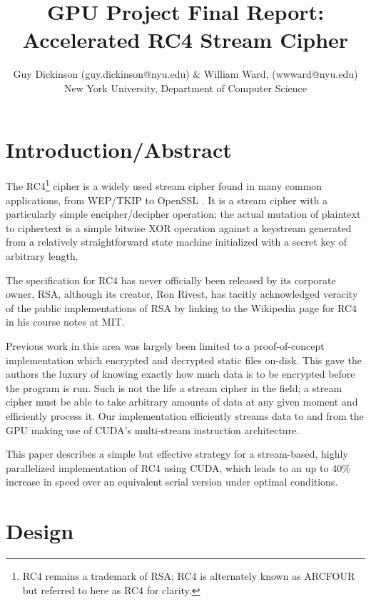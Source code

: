 \documentclass[twocolumn]{article}
\begin{document}
  
  \title{GPU Project Final Report: Accelerated RC4 Stream Cipher}
  \author{Guy Dickinson (guy.dickinson@nyu.edu) \& William Ward, (wwward@nyu.edu) \\ New York University, Department of Computer Science}
  \maketitle
  
  \section{Introduction/Abstract}
  The RC4\footnote{RC4 remains a trademark of RSA; RC4 is alternately known as ARCFOUR but referred to here as RC4 for clarity.} cipher is a widely used stream cipher found in many common applications, from WEP/TKIP \cite[p. 171]{cisco-netsec} to OpenSSL \cite{openssl}. It is a stream cipher with a particularly simple encipher/decipher operation; the actual mutation of plaintext to ciphertext is a simple bitwise XOR operation against a keystream generated from a relatively straightforward state machine initialized with a secret key of arbitrary length.
  
  The specification for RC4 has never officially been released by its corporate owner, RSA, although its creator, Ron Rivest, has tacitly acknowledged veracity of the public implementations of RSA by linking to the Wikipedia page for RC4 in his course notes at MIT.\cite{rivest-notes}
  
  Previous work in this area \cite{5276924} was largely been limited to a proof-of-concept implementation which encrypted and decrypted static files on-disk. This gave the authors the luxury of knowing exactly how much data is to be encrypted before the program is run. Such is not the life a stream cipher in the field; a stream cipher must be able to take arbitrary amounts of data at any given moment and efficiently process it. Our implementation efficiently streams data to and from the GPU making use of CUDA's multi-stream instruction architecture. 
  
  This paper describes a simple but effective strategy for a stream-based, highly parallelized implementation of RC4 using CUDA, which leads to an up to 40\% increase in speed over an equivalent serial version under optimal conditions.
  
  \section{Design}
  
\end{document}
